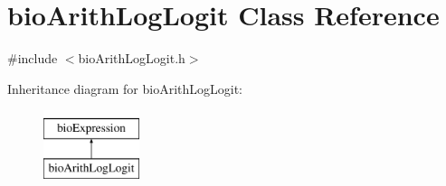 \hypertarget{classbio_arith_log_logit}{}\section{bio\+Arith\+Log\+Logit Class Reference}
\label{classbio_arith_log_logit}


{\ttfamily \#include $<$bio\+Arith\+Log\+Logit.\+h$>$}

Inheritance diagram for bio\+Arith\+Log\+Logit\+:\begin{figure}[H]
\begin{center}
\leavevmode
\includegraphics[height=2.000000cm]{classbio_arith_log_logit}
\end{center}
\end{figure}
